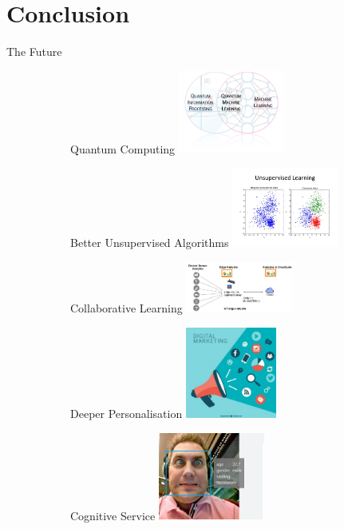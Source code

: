 \documentclass{beamer}
\begin{document}
\section{Conclusion}
\begin{frame}{The Future}
\begin{figure}
\centering
\begin{subfigure}{.3\textwidth}
  \centering
  Quantum Computing
  \includegraphics[width=3.5cm]{figures/qml}
\end{subfigure}%
\begin{subfigure}{.3\textwidth}
  \centering
  Better Unsupervised Algorithms
  \includegraphics[width=3.5cm]{figures/unsupervised}
\end{subfigure}
\begin{subfigure}{.33\textwidth}
  \centering
	Collaborative Learning
\includegraphics[width=3.5cm]{figures/collaborative}
\end{subfigure}%
\end{figure}
\begin{figure}
\centering
\begin{subfigure}{.4\textwidth}
  \centering
	Deeper Personalisation
	\includegraphics[width=3cm]{figures/personalisation}
\end{subfigure}
\begin{subfigure}{.4\textwidth}
  \centering
  Cognitive Service
  \includegraphics[width=3.5cm]{figures/cognitive}
\end{subfigure}
\end{figure}
\end{frame}
\end{document}
